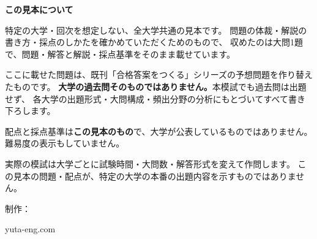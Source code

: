 \vspace{12mm}
\begin{center}
\begin{minipage}{0.84\linewidth}\small
\noindent\textbf{この見本について}
\par\vspace{1.5mm}
特定の大学・回次を想定しない、全大学共通の見本です。
問題の体裁・解説の書き方・採点のしかたを確かめていただくためのもので、
収めたのは大問1題で、問題・解答と解説・採点基準をそのまま載せています。

\par\vspace{2.0mm}
ここに載せた問題は、既刊「合格答案をつくる」シリーズの予想問題を作り替えたものです。
\textbf{大学の過去問そのものではありません。}本模試でも過去問は出題せず、
各大学の出題形式・大問構成・頻出分野の分析にもとづいてすべて書き下ろします。

\par\vspace{2.0mm}
配点と採点基準は\textbf{この見本のもの}で、大学が公表しているものではありません。
難易度の表示もしていません。

\par\vspace{2.0mm}
実際の模試は大学ごとに試験時間・大問数・解答形式を変えて作問します。
この見本の問題・配点が、特定の大学の本番の出題内容を示すものではありません。
\end{minipage}
\end{center}

\vfill
\begin{center}\footnotesize
  \sigrule\par\vspace{1.5mm}
  \MoshiBrand\par\vspace{1.0mm}
  制作：\MoshiAuthor\par\vspace{1.0mm}
  yuta-eng.com
\end{center}

